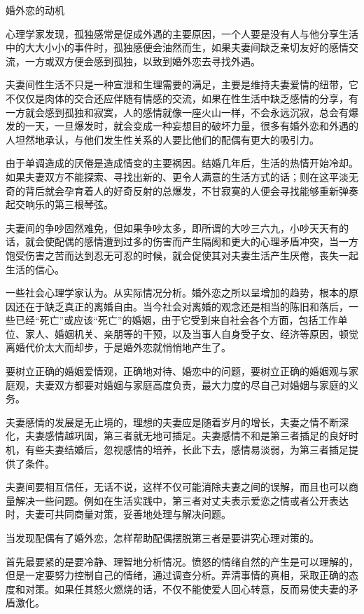 \documentclass[12pt,UTF8]{ctexbook}
\begin{document}
婚外恋的动机


心理学家发现，孤独感常是促成外遇的主要原因，一个人要是没有人与他分享生活中的大大小小的事件时，孤独感便会油然而生，如果夫妻间缺乏亲切友好的感情交流，一方或双方便会感到孤独，以致到婚外恋去寻找外遇。

夫妻间性生活不只是一种宣泄和生理需要的满足，主要是维持夫妻爱情的纽带，它不仅仅是肉体的交合还应伴随有情感的交流，如果在性生活中缺乏感情的分享，有一方就会感到孤独和寂寞，人的感情就像一座火山一样，不会永远沉寂，总会有爆发的一天，一旦爆发时，就会变成一种妄想目的破坏力量，很多有婚外恋和外遇的人坦然地承认，与他们发生性关系的人要比他们的配偶有更大的吸引力。

由于单调造成的厌倦是造成情变的主要祸因。结婚几年后，生活的热情开始冷却。如果夫妻双方不能探索、寻找出新的、更令人满意的生活方式的话；则在这平淡无奇的背后就会孕育着人的好奇反射的总爆发，不甘寂寞的人便会寻找能够重新弹奏起交响乐的第三根琴弦。

夫妻间的争吵固然难免，但如果争吵太多，即所谓的大吵三六九，小吵天天有的话，就会使配偶的感情遭到过多的伤害而产生隔阂和更大的心理矛盾冲突，当一方饱受伤害之苦而达到忍无可忍的时候，就会促使其对夫妻生活产生厌倦，丧失一起生活的信心。

一些社会心理学家认为。从实际情况分析。婚外恋之所以呈增加的趋势，根本的原因还在于缺乏真正的离婚自由。当今社会对离婚的观念还是相当的陈旧和落后，一些已经“死亡”或应该“死亡”的婚姻，由于它受到来自社会各个方面，包括工作单位、家人、婚姻机关、亲朋等的干预，以及当事人自身受子女、经济等原因，顿觉离婚代价太大而却步，于是婚外恋就悄悄地产生了。

要树立正确的婚姻爱情观，正确地对待、婚恋中的问题，要树立正确的婚姻观与家庭观，夫妻双方都要对婚姻与家庭高度负责，最大力度的尽自己对婚姻与家庭的义务。

夫妻感情的发展是无止境的，理想的夫妻应是随着岁月的增长，夫妻之情不断深化，夫妻感情越巩固，第三者就无地可插足。夫妻感情不和是第三者插足的良好时机，有些夫妻结婚后，忽视感情的培养，长此下去，感情易淡弱，为第三者插足提供了条件。

夫妻间要相互信任，无话不说，这样不仅可能消除夫妻之间的误解，而且也可以商量解决一些问题。例如在生活实践中，第三者对丈夫表示爱恋之情或者公开表达时，夫妻可共同商量对策，妥善地处理与解决问题。

当发现配偶有了婚外恋，怎样帮助配偶摆脱第三者是要讲究心理对策的。

首先最要紧的是要冷静、理智地分析情况。愤怒的情绪自然的产生是可以理解的，但是一定要努力控制自己的情绪，通过调查分析。弄清事情的真相，采取正确的态度和对策。如果任其怒火燃烧的话，不仅不能使爱人回心转意，反而易使夫妻的矛盾激化。
\end{document}
